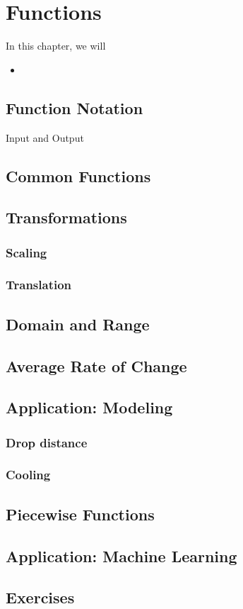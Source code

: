 
\chapter{Functions}

\begin{summary}
In this chapter, we will 
\begin{itemize}
    \item 
\end{itemize}
\end{summary}

\newpage 

\section{Function Notation}

Input and Output

\section{Common Functions}


\section{Transformations}

    \subsection{Scaling}
    \subsection{Translation}

\section{Domain and Range}

\section{Average Rate of Change}

\section{Application: Modeling}
    \subsection{Drop distance}
    \subsection{Cooling}
    
\section{Piecewise Functions}    

\section{Application: Machine Learning} 

\section{Exercises} 